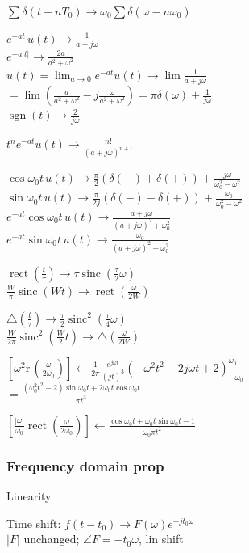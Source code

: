 \documentclass[4pt]{article}
\theoremstyle{definition}
\theoremstyle{definition}
\renewcommand{\r}{\mathrm{r}\,}             %
\renewcommand{\o}{\omega}
\newcommand{\ra}{\rightarrow}
\DeclareMathOperator{\rect}{rect}
\DeclareMathOperator{\sinc}{sinc}
\DeclareMathOperator{\sgn}{sgn}
\begin{document}
\begin{landscape}
\begin{multicols}{3}
    \(\sum \delta(t-nT_0) \ra \o_0\sum \delta(\o - n\o_0)\)        %

    $e^{-at} \, u(t) \ra \frac{1}{a+j\omega}$\\         %
    $e^{-a|t|} \ra \frac{2a}{a^2+\omega^2}$ \\
    \(u(t) = \lim_{a\ra 0} e^{-at} u(t)\ra \lim \frac{1}{a+j\o}\)
    \( = \lim(\frac{a}{a^2+\o^2} - j\frac{\o}{a^2+\o^2 }) = \pi\delta(\o) + \frac{1}{j\o}\) \\      %
    \(\sgn(t)\ra \frac{2}{j\o}\)

    \(t^n e^{-at} u(t)\ra \frac{n!}{(a+j\o)^{n+1}}\)

    \(\cos \o_0 t\, u(t)\ra \frac{\pi}{2}(\delta(-) + \delta(+)) + \frac{j\o}{\o_0^2-\o^2}\)\\       %
    \(\sin \o_0 t\, u(t)\ra \frac{\pi}{2j}(\delta(-) - \delta(+)) + \frac{\o_0}{\o_0^2-\o^2}\)\\
    \(e^{-at}\cos \o_0t\, u(t)\ra \frac{a+j\o}{(a+j\o)^2 + \o_0^2}\)\\
    \(e^{-at}\sin \o_0t\, u(t)\ra \frac{\o_0}{(a+j\o)^2 + \o_0^2}\)           


    $\rect(\frac t {\tau}) \ra \tau \sinc(\frac{\tau}{2}\omega)$\\ 
    $\frac W \pi \sinc(Wt) \ra \rect(\frac{\omega}{2W})$

    \(\triangle (\frac t {\tau}) \ra \frac{\tau}{2} \sinc^2 (\frac{\tau}{4}\omega)\)\\
    \(\frac{W}{2\pi} \sinc^2 (\frac{W}{2}t) \ra \triangle(\frac{\omega}{2W})\)

    \([\o^2 \r(\frac{\o}{2\o_0})] \leftarrow \frac{1}{2\pi} \frac{e^{j\o t}}{(jt)^3}(-\o^2t^2-2j\o t + 2)^{\o_0}_{-\o_0}\)\\
    \(=\frac{(\o_0^2 t^2 - 2)\sin \o_0 t + 2\o_0 t\cos \o_0 t}{\pi t^3}\)\

    \([\frac{|\o|}{\o_0} \rect(\frac{\o}{2\o_0})] \leftarrow \frac{\cos \o_0 t + \o_0 t \sin \o_0 t - 1}{\o_0 \pi t^2}\)
\subsubsection*{Frequency domain prop}
    Linearity

    Time shift: \(f(t-t_0) \ra F(\omega) e^{-jt_0\omega}\) \\ %
    $|F|$ unchanged; $\angle F =- t_0\omega$, lin shift


\end{multicols}
\end{landscape}
\end{document}
